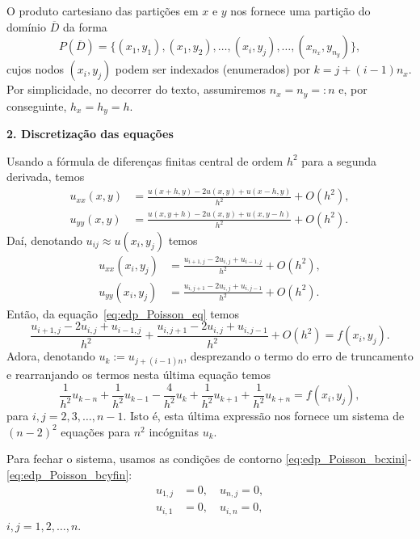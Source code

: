 O produto cartesiano das partições em $x$ e $y$ nos fornece uma partição do domínio $\overline{D}$ da forma
\begin{equation}
  P(\overline{D}) = \{(x_1, y_1), (x_1, y_2), \dotsc, (x_i, y_j), \dotsc, (x_{n_x}, y_{n_y})\},
\end{equation}
cujos nodos $(x_i, y_j)$ podem ser indexados (enumerados) por $k = j + (i-1)n_x$.  Por simplicidade, no decorrer do texto, assumiremos $n_x=n_y=:n$ e, por conseguinte, $h_x=h_y=h$.

\begin{flushleft}
  {\bf 2. Discretização das equações}
\end{flushleft}

Usando a fórmula de diferenças finitas central de ordem $h^2$ para a segunda derivada, temos
\begin{align}
  u_{xx}(x,y) &= \frac{u(x+h,y)-2u(x,y)+u(x-h,y)}{h^2} + O(h^2),\\
  u_{yy}(x,y) &= \frac{u(x,y+h)-2u(x,y)+u(x,y-h)}{h^2} + O(h^2).
\end{align}
Daí, denotando $u_{ij}\approx u(x_i, y_j)$ temos
\begin{align}
  u_{xx}(x_i,y_j) &= \frac{u_{i+1,j}-2u_{i,j}+u_{i-1,j}}{h^2} + O(h^2),\\
  u_{yy}(x_i,y_j) &= \frac{u_{i,j+1}-2u_{i,j}+u_{i,j-1}}{h^2} + O(h^2).  
\end{align}
Então, da equação~\ref{eq:edp_Poisson_eq} temos
\begin{equation}
  \frac{u_{i+1,j}-2u_{i,j}+u_{i-1,j}}{h^2} + \frac{u_{i,j+1}-2u_{i,j}+u_{i,j-1}}{h^2} + O(h^2) = f(x_i,y_j).
\end{equation}
Adora, denotando $u_k := u_{j+(i-1)n}$, desprezando o termo do erro de truncamento e rearranjando os termos nesta última equação temos
\begin{equation}\label{eq:edp_Poisson_mdf_sis0}
  \frac{1}{h^2}u_{k-n} + \frac{1}{h^2}u_{k-1} -\frac{4}{h^2}u_{k} + \frac{1}{h^2}u_{k+1} + \frac{1}{h^2}u_{k+n} = f(x_i,y_j),
\end{equation}
para $i,j=2, 3, \dotsc, n-1$. Isto é, esta última expressão nos fornece um sistema de $(n-2)^2$ equações para $n^2$ incógnitas $u_k$.

Para fechar o sistema, usamos as condições de contorno \eqref{eq:edp_Poisson_bcxini}-\eqref{eq:edp_Poisson_bcyfin}:
\begin{align}
  u_{1,j} &= 0,\quad u_{n,j}=0,\label{eq:edp_Poisson_mdf_sis1}\\
  u_{i,1} &= 0,\quad u_{i,n}=0\label{eq:edp_Poisson_mdf_sis2},
\end{align}
$i,j=1, 2, \dotsc, n$.

